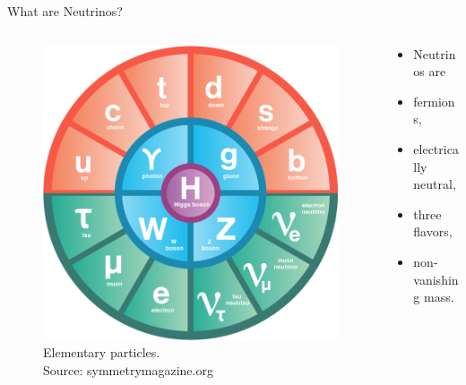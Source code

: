 \documentclass[9pt]{beamer}
\begin{document}
\begin{darkframes}
\begin{frame}{What are Neutrinos?}
\begin{minipage}[\textheight]{\textwidth}
\begin{columns}[T]
      \begin{column}{0.6\textwidth}
      \begin{figure}
      \includegraphics[width=0.9\linewidth,height=0.8\textheight,keepaspectratio]{assets/standard-model}
      \caption*{Elementary particles. \\ Source: symmetrymagazine.org} %
      \end{figure}
      \end{column}

      \begin{column}{0.4\textwidth}


          \begin{itemize}
          \item[] Neutrinos are
          \item fermions,
          \item electrically neutral,
          \item three flavors,
          \item non-vanishing mass.
          \end{itemize}




\end{column}
\end{columns}
\end{minipage}
\end{frame}
\end{darkframes}
\end{document}
